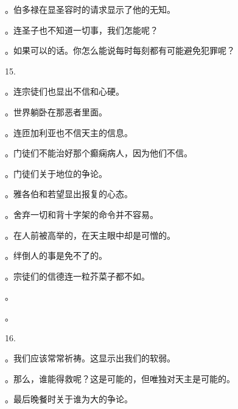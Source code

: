 。伯多禄在显圣容时的请求显示了他的无知。\par

。连圣子也不知道一切事，我们怎能呢？\par

。如果可以的话。你怎么能说每时每刻都有可能避免犯罪呢？\par

15.\par

。连宗徒们也显出不信和心硬。\par

。世界躺卧在那恶者里面。\par

。连匝加利亚也不信天主的信息。\par

。门徒们不能治好那个癫痫病人，因为他们不信。\par

。门徒们关于地位的争论。\par

。雅各伯和若望显出报复的心态。\par

。舍弃一切和背十字架的命令并不容易。\par

。在人前被高举的，在天主眼中却是可憎的。\par

。绊倒人的事是免不了的。\par

。宗徒们的信德连一粒芥菜子都不如。\par

。\par

。\par

16.\par

。我们应该常常祈祷。这显示出我们的软弱。\par

。那么，谁能得救呢？这是可能的，但唯独对天主是可能的。\par

。最后晚餐时关于谁为大的争论。\par

